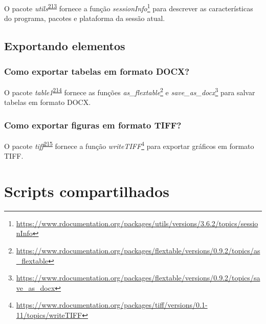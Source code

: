 \documentclass[
  a4paper,
]{book}
\renewcommand{\href}[2]{#2\footnote{\url{#1}}}
\newenvironment{infobox}[1]
  {
  \begin{itemize}
  \renewcommand{\labelitemi}{
    \raisebox{-.7\height}[0pt][0pt]{
      {\setkeys{Gin}{width=3em,keepaspectratio}
        \texttt{[image: \#1]}}
    }
  }
  \setlength{\fboxsep}{1em}
  \begin{blackbox}
  \item
  }
  {
  \end{blackbox}
  \end{itemize}
  }
\begin{document}
\begin{infobox}{images/Rlogo}
O pacote \emph{utils}\textsuperscript{\protect\hyperlink{ref-utils}{213}} fornece a função \href{https://www.rdocumentation.org/packages/utils/versions/3.6.2/topics/sessionInfo}{\emph{sessionInfo}} para descrever as características do programa, pacotes e plataforma da sessão atual.

\end{infobox}

\hypertarget{exportar}{%
\section{Exportando elementos}\label{exportar}}

\hypertarget{como-exportar-tabelas-em-formato-docx}{%
\subsection{Como exportar tabelas em formato DOCX?}\label{como-exportar-tabelas-em-formato-docx}}

\begin{infobox}{images/Rlogo}
O pacote \emph{table1}\textsuperscript{\protect\hyperlink{ref-flextable}{214}} fornece as funções \href{https://www.rdocumentation.org/packages/flextable/versions/0.9.2/topics/as_flextable}{\emph{as\_flextable}} e \href{https://www.rdocumentation.org/packages/flextable/versions/0.9.2/topics/save_as_docx}{\emph{save\_as\_docx}} para salvar tabelas em formato DOCX.

\end{infobox}

\hypertarget{como-exportar-figuras-em-formato-tiff}{%
\subsection{Como exportar figuras em formato TIFF?}\label{como-exportar-figuras-em-formato-tiff}}

\begin{infobox}{images/Rlogo}
O pacote \emph{tiff}\textsuperscript{\protect\hyperlink{ref-tiff}{215}} fornece a função \href{https://www.rdocumentation.org/packages/tiff/versions/0.1-11/topics/writeTIFF}{\emph{writeTIFF}} para exportar gráficos em formato TIFF.

\end{infobox}

\hypertarget{scripts-compartilhados}{%
\chapter{\texorpdfstring{\textbf{Scripts compartilhados}}{Scripts compartilhados}}\label{scripts-compartilhados}}
\end{document}
